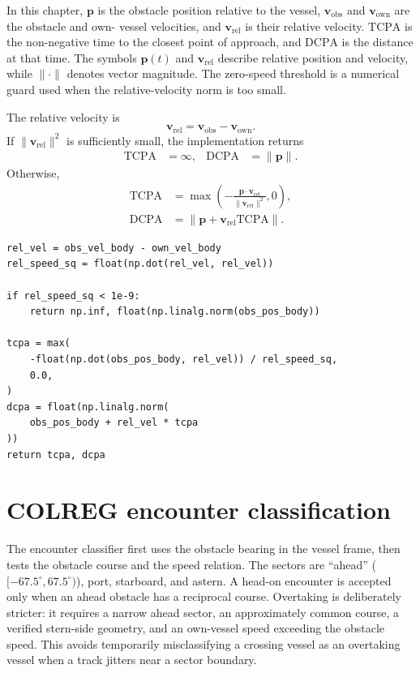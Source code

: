 \documentclass[11pt,a4paper]{article}
\begin{document}
In this chapter, $\bm{p}$ is the obstacle position relative to the vessel,
$\bm{v}_{\mathrm{obs}}$ and $\bm{v}_{\mathrm{own}}$ are the obstacle and own-
vessel velocities, and $\bm{v}_{\mathrm{rel}}$ is their relative velocity.
$\mathrm{TCPA}$ is the non-negative time to the closest point of approach,
and $\mathrm{DCPA}$ is the distance at that time. The symbols $\bm{p}(t)$ and
$\bm{v}_{\mathrm{rel}}$ describe relative position and velocity, while
$\lVert\cdot\rVert$ denotes vector magnitude. The zero-speed threshold is a
numerical guard used when the relative-velocity norm is too small.

The relative velocity is
\begin{equation}
\bm{v}_{\mathrm{rel}}=\bm{v}_{\mathrm{obs}}-\bm{v}_{\mathrm{own}}.
\end{equation}
If $\lVert\bm{v}_{\mathrm{rel}}\rVert^2$ is sufficiently small, the implementation returns
\begin{equation}
\begin{aligned}
\mathrm{TCPA} &= \infty, &
\mathrm{DCPA} &= \lVert\bm{p}\rVert.
\end{aligned}
\end{equation}
Otherwise,
\begin{align}
\mathrm{TCPA}&=\max\left(
-\frac{\bm{p}\cdot\bm{v}_{\mathrm{rel}}}
{\lVert\bm{v}_{\mathrm{rel}}\rVert^2},0\right),\\
\mathrm{DCPA}&=\left\lVert
\bm{p}+\bm{v}_{\mathrm{rel}}\mathrm{TCPA}
\right\rVert.
\end{align}

\begin{lstlisting}
rel_vel = obs_vel_body - own_vel_body
rel_speed_sq = float(np.dot(rel_vel, rel_vel))

if rel_speed_sq < 1e-9:
    return np.inf, float(np.linalg.norm(obs_pos_body))

tcpa = max(
    -float(np.dot(obs_pos_body, rel_vel)) / rel_speed_sq,
    0.0,
)
dcpa = float(np.linalg.norm(
    obs_pos_body + rel_vel * tcpa
))
return tcpa, dcpa
\end{lstlisting}

\section{COLREG encounter classification}

The encounter classifier first uses the obstacle bearing in the vessel frame,
then tests the obstacle course and the speed relation. The sectors are
``ahead'' ($[-67.5^\circ,67.5^\circ)$), port, starboard, and astern. A
head-on encounter is accepted only when an ahead obstacle has a reciprocal
course. Overtaking is deliberately stricter: it requires a narrow ahead
sector, an approximately common course, a verified stern-side geometry, and
an own-vessel speed exceeding the obstacle speed. This avoids temporarily
misclassifying a crossing vessel as an overtaking vessel when a track jitters
near a sector boundary.
\end{document}
